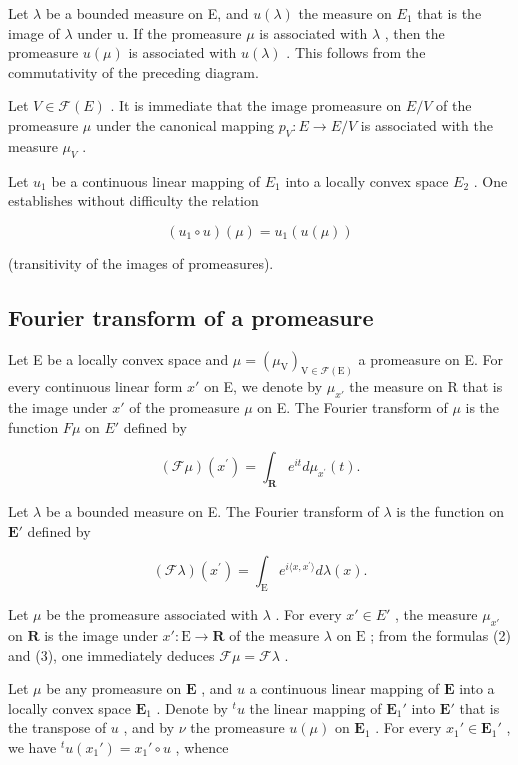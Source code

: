 Let \(\lambda\) be a bounded measure on E, and \(u(\lambda)\) the measure on \(E_{1}\) that is the image of \(\lambda\) under u. If the promeasure \(\mu\) is associated with \(\lambda\) , then the promeasure \(u(\mu)\) is associated with \(u(\lambda)\) . This follows from the commutativity of the preceding diagram.

Let \(V \in \mathcal{F}(E)\) . It is immediate that the image promeasure on \(E/V\) of the promeasure \(\mu\) under the canonical mapping \(p_V: E \to E/V\) is associated with the measure \(\mu_V\) .

Let \(u_{1}\) be a continuous linear mapping of \(E_{1}\) into a locally convex space \(E_{2}\) . One establishes without difficulty the relation

\[
(u _ {1} \circ u) (\mu) = u _ {1} (u (\mu))
\]

(transitivity of the images of promeasures).

\subsection{Fourier transform of a promeasure}

Let E be a locally convex space and \(\mu = (\mu_{\mathrm{V}})_{\mathrm{V} \in \mathcal{F}(\mathrm{E})}\) a promeasure on E. For every continuous linear form \(x'\) on E, we denote by \(\mu_{x'}\) the measure on R that is the image under \(x'\) of the promeasure \(\mu\) on E. The Fourier transform of \(\mu\) is the function \(F\mu\) on \(E'\) defined by

\[
(\mathcal {F} \mu) (x ^ {\prime}) = \int_ {\mathbf {R}} e ^ {i t} d \mu_ {x ^ {\prime}} (t).\tag{2}
\]

Let \(\lambda\) be a bounded measure on E. The Fourier transform of \(\lambda\) is the function on \(\mathbf{E}'\) defined by

\[
(\mathcal {F} \lambda) (x ^ {\prime}) = \int_ {\mathrm{E}} e ^ {i \langle x, x ^ {\prime} \rangle} d \lambda (x).\tag{3}
\]

Let \(\mu\) be the promeasure associated with \(\lambda\) . For every \(x' \in E'\) , the measure \(\mu_{x'}\) on \(\mathbf{R}\) is the image under \(x': \mathrm{E} \to \mathbf{R}\) of the measure \(\lambda\) on \(\mathrm{E}\) ; from the formulas (2) and (3), one immediately deduces \(\mathcal{F}\mu = \mathcal{F}\lambda\) .

Let \(\mu\) be any promeasure on \(\mathbf{E}\) , and \(u\) a continuous linear mapping of \(\mathbf{E}\) into a locally convex space \(\mathbf{E}_1\) . Denote by \(^t u\) the linear mapping of \(\mathbf{E}_1'\) into \(\mathbf{E}'\) that is the transpose of \(u\) , and by \(\nu\) the promeasure \(u(\mu)\) on \(\mathbf{E}_1\) . For every \(x_1' \in \mathbf{E}_1'\) , we have \(^t u(x_1') = x_1' \circ u\) , whence

